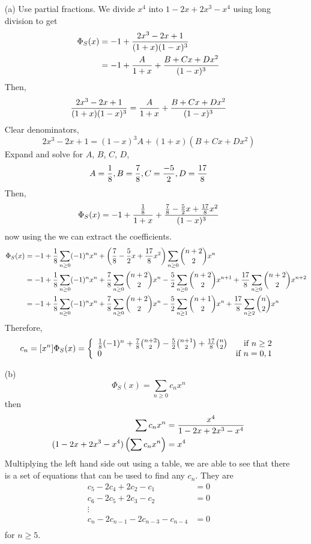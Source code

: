 \documentclass[english, 11pt]{article}
\begin{document}
       \begin{itemize}
         \item[(a)] Use partial fractions.
         We divide $x^4$ into $1-2x+2x^3 -x^4$ using long division to get
         \begin{align*}
           \Phi_S(x) & = -1 + \frac{2x^3-2x+1}{(1+x)(1-x)^3} \\
           & = -1 + \frac{A}{1+x} + \frac{B+Cx+Dx^2}{(1-x)^3}
         \end{align*}
         Then,
         \[ \frac{2x^3-2x+1}{(1+x)(1-x)^3} = \frac{A}{1+x} + \frac{B+Cx+Dx^2}{(1-x)^3} \]
         Clear denominators,
         \[ 2x^3 - 2x + 1 = (1-x)^3A + (1+x)(B+Cx+Dx^2) \]
         Expand and solve for $A$, $B$, $C$, $D$,
         \[ A = \frac{1}{8}, B = \frac{7}{8}, C= \frac{-5}{2}, D = \frac{17}{8} \]
         Then,
         \[ \Phi_S(x) = -1 + \frac{\frac{1}{8}}{1+x} + \frac{\frac{7}{8} - \frac{5}{2}x + \frac{17}{8}x^2}{(1-x)^3} \]
         now using the  we can extract the coefficients.
         \begin{align*}
           \Phi_S(x) & = -1 + \frac{1}{8}\sum_{n \geq 0} (-1)^nx^n + \left( \frac{7}{8} - \frac{5}{2}x + \frac{17}{8}x^2 \right) \sum_{n \geq 0}{n+2 \choose 2} x^n \\
             & = -1 + \frac{1}{8}\sum_{n \geq 0} (-1)^nx^n + \frac{7}{8} \sum_{n \geq 0}{n+2 \choose 2}x^n - \frac{5}{2}\sum_{n\geq 0} {n+2 \choose 2}x^{n+1} + \frac{17}{8} \sum_{n \geq 0} {n+2 \choose 2} x^{n+2} \\
             & = -1 + \frac{1}{8}\sum_{n \geq 0} (-1)^nx^n + \frac{7}{8} \sum_{n \geq 0}{n+2 \choose 2}x^n - \frac{5}{2}\sum_{n\geq 1} {n+1 \choose 2}x^{n} + \frac{17}{8} \sum_{n \geq 2} {n \choose 2} x^{n}
         \end{align*}
         Therefore,
         \[c_n =  [x^n] \Phi_S(x) = \left\{ \begin{array}{lr} \frac{1}{8}(-1)^n + \frac{7}{8}{n+2 \choose 2} -\frac{5}{2}{n+1 \choose 2} + \frac{17}{8}{n \choose 2} & \mbox{if $n \geq 2$} \\ 0 & \mbox{if $n = 0, 1$} \end{array} \right. \]

         \item[(b)] \[ \Phi_S(x) = \sum_{n \geq 0} c_nx^n \]
         then
         \begin{align*}
           \sum c_nx^n & = \frac{x^4}{1-2x+2x^3-x^4} \\
           (1-2x+2x^3-x^4)\left( \sum c_n x^n \right) & = x^4 \\
         \end{align*}
         Multiplying the left hand side out using a table, we are able to see that there is a set of equations that can be used to find any $c_n$. They are
         \begin{align*}
           c_5 - 2c_4 + 2c_2 - c_1 & = 0 \\
           c_6 - 2c_5 +2c_3 - c_2 & = 0 \\
           \vdots \\
           c_n - 2c_{n-1} - 2c_{n-3} - c_{n-4} & = 0 \\
         \end{align*}
         for $n \geq 5$.
       \end{itemize}
\end{document}
